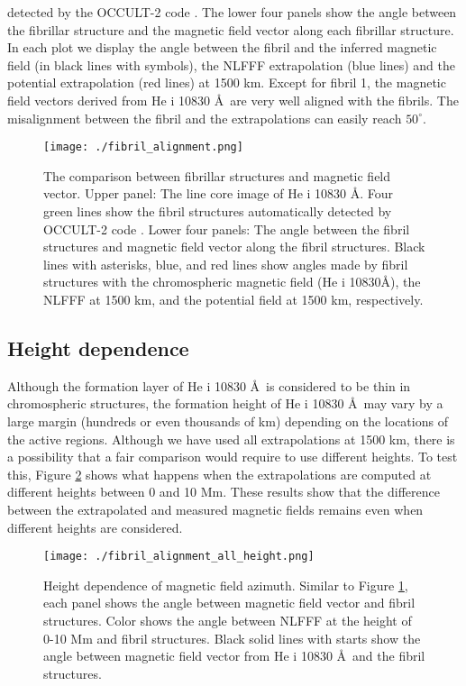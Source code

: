\documentclass[manuscript]{aastex61}
\begin{document}
detected by the OCCULT-2 code \citep{2013Entrp..15.3007A}. The lower four panels
show the angle between the fibrillar structure and the magnetic field vector along each
fibrillar structure. In each plot we display the angle between the fibril and
the inferred magnetic field (in black lines with symbols), the NLFFF extrapolation (blue lines)
and the potential extrapolation (red lines) at 1500 km. Except for fibril 1, the magnetic field vectors 
derived from He {\sc i} 10830 \AA \ are very well aligned with the fibrils. The misalignment
between the fibril and the extrapolations can easily reach $50^\circ$.
\begin{figure}
\texttt{[image: ./fibril\_alignment.png]}
\caption{The comparison between fibrillar structures and magnetic field vector. Upper panel:  The line core image of He {\sc i} 10830 \AA. Four green
lines show the  fibril structures automatically detected by OCCULT-2 code
\citep{2013Entrp..15.3007A}. Lower four panels: The angle between the fibril
structures and magnetic field vector along the fibril structures. Black lines
with asterisks, blue, and red lines show angles made by fibril structures with
the chromospheric magnetic field (He {\sc i} 10830\AA), the NLFFF at 1500 km,
and the potential field at 1500 km, respectively.}
\label{sec3:fibril_alignment}
\end{figure}

\subsection{Height dependence
\label{sec3:evaluation}}
Although the formation layer of He {\sc i} 10830 \AA \ is considered to be thin in
chromospheric structures, the formation height of He {\sc i} 10830 \AA \ may vary by a
large margin (hundreds or even thousands of km) depending on the locations of the active
regions. 
Although we have used all extrapolations at 1500 km, there is a possibility that 
a fair comparison would require to use different heights. 
To test this, Figure \ref{sec3:fibril_alignment_all_height} shows what happens 
when the extrapolations are computed at different heights between 0 and 10 Mm. These
results show that the difference between the extrapolated and measured magnetic
fields remains even when different heights are considered.
 \begin{figure}
\texttt{[image: ./fibril\_alignment\_all\_height.png]}
\caption{Height dependence of magnetic field azimuth. Similar to Figure \ref{sec3:fibril_alignment}, each panel shows the angle between magnetic field vector and fibril structures. Color shows the angle between NLFFF at the height of 0-10 Mm and fibril structures. Black solid lines with starts show the angle between magnetic field vector from He {\sc i} 10830 \AA \ and the fibril structures.}
\label{sec3:fibril_alignment_all_height}
\end{figure}
\end{document}
